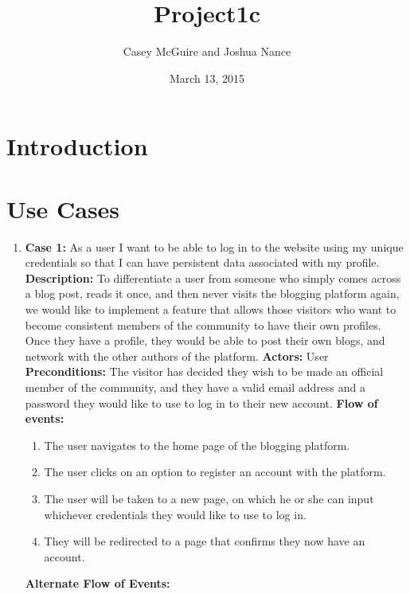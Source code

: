 \documentclass{article}
\title{Project1c}
\author{Casey McGuire and Joshua Nance}
\date{March 13, 2015}
\begin{document}
\maketitle

\section{Introduction}

\section{Use Cases}
\begin{enumerate}
    \item  \textbf{Case 1: }As a user I want to be able to log in to the website using my unique credentials so that I can have persistent data associated with my profile.
    \newline \textbf{Description: }To differentiate a user from someone who simply comes across a blog post, reads it once, and then never visits the blogging platform again, we would like to implement a feature that allows those visitors who want to become consistent members of the community to have their own profiles.  Once they have a profile, they would be able to post their own blogs, and network with the other authors of the platform.
    \newline \textbf{Actors: }User
    \newline \textbf{Preconditions: }The visitor has decided they wish to be made an official member of the community, and they have a valid email address and a password they would like to use to log in to their new account.
    \newline \textbf{Flow of events: }
    \begin{enumerate}
        \item The user navigates to the home page of the blogging platform.
        \item The user clicks on an option to register an account with the platform.
        \item The user will be taken to a new page, on which he or she can input whichever credentials they would like to use to log in.
        \item They will be redirected to a page that confirms they now have an account.
    \end{enumerate}
    \newline \textbf{Alternate Flow of Events: }
    \begin{enumerate}

\end{enumerate}
\end{enumerate}
\end{document}

